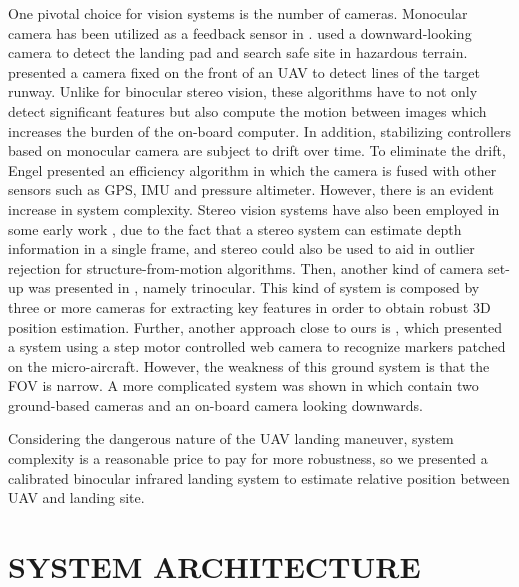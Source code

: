 \documentclass[letterpaper, 10 pt, conference]{ieeeconf}  %
\begin{document}
One pivotal choice for vision systems is the number of cameras. Monocular camera has been utilized as a feedback sensor in \cite{538972}\cite{Shakernia1999}. \cite{Zhao2012}\cite{Johnson2005} used a downward-looking camera to detect the landing pad and search safe site in hazardous terrain. \cite{Bourquardez2007} presented a camera fixed on the front of an UAV to detect lines of the target runway. Unlike for binocular stereo vision, these algorithms have to not only detect significant features but also compute the motion between images which increases the burden of the on-board computer. In addition, stabilizing controllers based on monocular camera \cite{Zingg2010} are subject to drift over time. To eliminate the drift, Engel\cite{engel2012camera} presented an efficiency algorithm in which the camera is fused with other sensors such as GPS, IMU and pressure altimeter. However, there is an evident increase in system complexity. Stereo vision systems have also been employed in some early work \cite{
Saripalli2003a}\cite{1331783}\cite{Altug2005}, due to the fact that a stereo system can estimate depth
information in a single frame, and stereo could also be used to aid in outlier rejection for structure-from-motion algorithms. Then, another kind of camera set-up was presented in \cite{Martinez2009}, namely trinocular. This kind of system is composed by three or more cameras for extracting key features in order to obtain robust 3D position estimation. Further, another approach close to ours is  \cite{Wang2006}, which presented  a system using a step motor controlled web camera to recognize markers patched on the micro-aircraft. However, the weakness of this ground system is that the FOV is narrow. A more complicated system was shown in \cite{Altug2005} which contain two ground-based cameras and an on-board camera looking downwards.

Considering the dangerous nature of the UAV landing maneuver, system complexity is a reasonable price to pay for more robustness, so we presented a calibrated binocular infrared landing system to estimate relative position between UAV and landing site.


\section{SYSTEM ARCHITECTURE}
\end{document}
